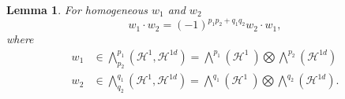 \documentclass[aps,preprint]{revtex4}%
\newtheorem{lemma}[theorem]{Lemma}
\begin{document}
\begin{lemma}
For \emph{homogeneous} $w_{1}$ and $w_{2}$%
\begin{equation}
w_{1}\cdot w_{2}=\left(  -1\right)  ^{p_{1}p_{2}+q_{1}q_{2}}w_{2}\cdot w_{1},
\end{equation}
where
\begin{align}
w_{1}  &  \in%
{\textstyle\bigwedge\nolimits_{p_{2}}^{p_{1}}}
\left(  \mathcal{H}^{1},\mathcal{H}^{1d}\right)  =%
{\textstyle\bigwedge\nolimits^{p_{1}}}
\left(  \mathcal{H}^{1}\ \right)
{\textstyle\bigotimes}
{\textstyle\bigwedge\nolimits^{p_{2}}}
\left(  \mathcal{H}^{1d}\right) \\
w_{2}  &  \in%
{\textstyle\bigwedge\nolimits_{q_{2}}^{q_{1}}}
\left(  \mathcal{H}^{1},\mathcal{H}^{1d}\right)  =%
{\textstyle\bigwedge\nolimits^{q_{1}}}
\left(  \mathcal{H}^{1}\ \right)
{\textstyle\bigotimes}
{\textstyle\bigwedge\nolimits^{q_{2}}}
\left(  \mathcal{H}^{1d}\right)  .
\end{align}

\end{lemma}
\end{document}
